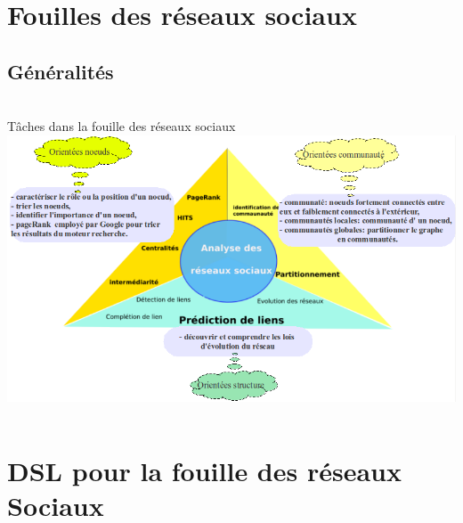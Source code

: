 \documentclass[10pt]{beamer}
\begin{document}
\section{Fouilles des réseaux sociaux}
\subsection{Généralités}
\begin{frame}%
\frametitle{}
\begin{columns}[T]
    \begin{column}{.895\textwidth}
    \begin{block}{Tâches dans la fouille des réseaux sociaux}
    \includegraphics[scale=0.38]{images/tache_fouille_donnees_2.png}
    \end{block}
    \end{column}
  \end{columns}
\end{frame}

\section{DSL pour la fouille des réseaux Sociaux}
\end{document}
